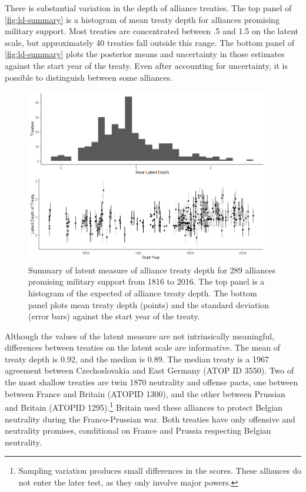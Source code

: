 \documentclass[12pt]{article}
\begin{document}
There is substantial variation in the depth of alliance treaties. 
The top panel of \autoref{fig:ld-summary} is a histogram of mean treaty depth for alliances promising military support.  
Most treaties are concentrated between .5 and 1.5 on the latent scale, but approximately 40 treaties fall outside this range. 
The bottom panel of \autoref{fig:ld-summary} plots the posterior means and uncertainty in those estimates against the start year of the treaty. 
Even after accounting for uncertainty, it is possible to distinguish between some alliances. 


\begin{figure}
	\centering
		\includegraphics[width=0.95\textwidth]{../figures/ld-summary.png}
	\caption{Summary of latent measure of alliance treaty depth for 289 alliances promising military support from 1816 to 2016. The top panel is a histogram of the expected of alliance treaty depth. The bottom panel plots mean treaty depth (points) and the standard deviation (error bars) against the start year of the treaty.}
	\label{fig:ld-summary}
\end{figure}


Although the values of the latent measure are not intrinsically meaningful, differences between treaties on the latent scale are informative. 
The mean of treaty depth is 0.92, and the median is 0.89. 
The median treaty is a 1967 agreement between Czechoslovakia and East Germany (ATOP ID 3550). 
Two of the most shallow treaties are twin 1870 neutrality and offense pacts, one between between France and Britain (ATOPID 1300), and the other between Prussian and Britain (ATOPID 1295).\footnote{
Sampling variation produces small differences in the scores. These alliances do not enter the later test, as they only involve major powers.} 
Britain used these alliances to protect Belgian neutrality during the Franco-Prussian war.  
Both treaties have only offensive and neutrality promises, conditional on France and Prussia respecting Belgian neutrality. 
\end{document}
